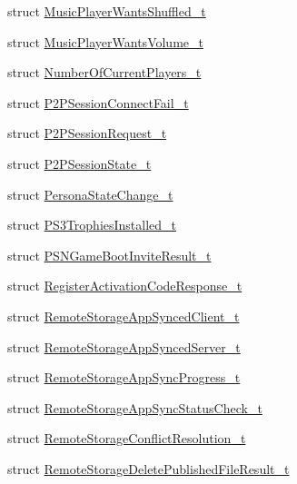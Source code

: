 \begin{DoxyCompactItemize}
struct \hyperlink{structValve_1_1Steamworks_1_1MusicPlayerWantsShuffled__t}{Music\+Player\+Wants\+Shuffled\+\_\+t}
\item 
struct \hyperlink{structValve_1_1Steamworks_1_1MusicPlayerWantsVolume__t}{Music\+Player\+Wants\+Volume\+\_\+t}
\item 
struct \hyperlink{structValve_1_1Steamworks_1_1NumberOfCurrentPlayers__t}{Number\+Of\+Current\+Players\+\_\+t}
\item 
struct \hyperlink{structValve_1_1Steamworks_1_1P2PSessionConnectFail__t}{P2\+P\+Session\+Connect\+Fail\+\_\+t}
\item 
struct \hyperlink{structValve_1_1Steamworks_1_1P2PSessionRequest__t}{P2\+P\+Session\+Request\+\_\+t}
\item 
struct \hyperlink{structValve_1_1Steamworks_1_1P2PSessionState__t}{P2\+P\+Session\+State\+\_\+t}
\item 
struct \hyperlink{structValve_1_1Steamworks_1_1PersonaStateChange__t}{Persona\+State\+Change\+\_\+t}
\item 
struct \hyperlink{structValve_1_1Steamworks_1_1PS3TrophiesInstalled__t}{P\+S3\+Trophies\+Installed\+\_\+t}
\item 
struct \hyperlink{structValve_1_1Steamworks_1_1PSNGameBootInviteResult__t}{P\+S\+N\+Game\+Boot\+Invite\+Result\+\_\+t}
\item 
struct \hyperlink{structValve_1_1Steamworks_1_1RegisterActivationCodeResponse__t}{Register\+Activation\+Code\+Response\+\_\+t}
\item 
struct \hyperlink{structValve_1_1Steamworks_1_1RemoteStorageAppSyncedClient__t}{Remote\+Storage\+App\+Synced\+Client\+\_\+t}
\item 
struct \hyperlink{structValve_1_1Steamworks_1_1RemoteStorageAppSyncedServer__t}{Remote\+Storage\+App\+Synced\+Server\+\_\+t}
\item 
struct \hyperlink{structValve_1_1Steamworks_1_1RemoteStorageAppSyncProgress__t}{Remote\+Storage\+App\+Sync\+Progress\+\_\+t}
\item 
struct \hyperlink{structValve_1_1Steamworks_1_1RemoteStorageAppSyncStatusCheck__t}{Remote\+Storage\+App\+Sync\+Status\+Check\+\_\+t}
\item 
struct \hyperlink{structValve_1_1Steamworks_1_1RemoteStorageConflictResolution__t}{Remote\+Storage\+Conflict\+Resolution\+\_\+t}
\item 
struct \hyperlink{structValve_1_1Steamworks_1_1RemoteStorageDeletePublishedFileResult__t}{Remote\+Storage\+Delete\+Published\+File\+Result\+\_\+t}
\item 

\end{DoxyCompactItemize}
